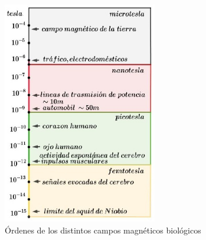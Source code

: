 \begin{itemize}
\begin{figure}[H]
    \centering
    \includegraphics[width=0.6\textwidth]{./Figures/fig446}
	\caption{Órdenes de los distintos campos magnéticos biológicos}
	\label{fig:446}
\end{figure}
	

\end{itemize}


